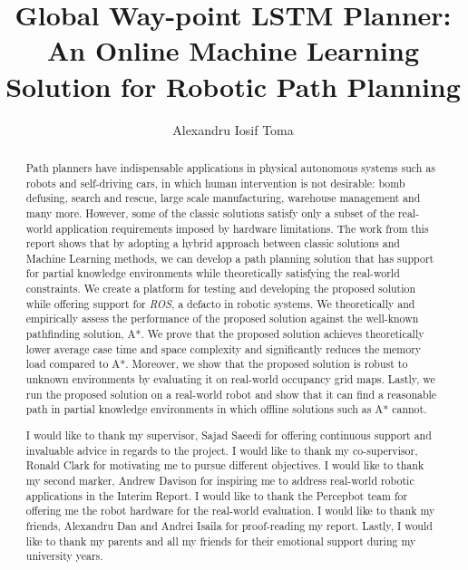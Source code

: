 \documentclass[a4paper, twoside]{report}
\title{Global Way-point LSTM Planner: An Online Machine Learning Solution for Robotic Path Planning}
\author{Alexandru Iosif Toma}
\begin{document}


\newpage
\mbox{}
\newpage

\begin{abstract}

Path planners have indispensable applications in physical autonomous systems such as robots and self-driving cars, in which human intervention is not desirable: bomb defusing, search and rescue, large scale manufacturing, warehouse management and many more. However, some of the classic solutions satisfy only a subset of the real-world application requirements imposed by hardware limitations. The work from this report shows that by adopting a hybrid approach between classic solutions and Machine Learning methods, we can develop a path planning solution that has support for partial knowledge environments while theoretically satisfying the real-world constraints. We create a platform for testing and developing the proposed solution while offering support for \textit{ROS}, a defacto in robotic systems. We theoretically and empirically assess the performance of the proposed solution against the well-known pathfinding solution, A*. We prove that the proposed solution achieves theoretically lower average case time and space complexity and significantly reduces the memory load compared to A*. Moreover, we show that the proposed solution is robust to unknown environments by evaluating it on real-world occupancy grid maps. Lastly, we run the proposed solution on a real-world robot and show that it can find a reasonable path in partial knowledge environments in which offline solutions such as A* cannot.


%

\end{abstract}

\renewcommand{\abstractname}{Acknowledgements}
\begin{abstract}

I would like to thank my supervisor, Sajad Saeedi for offering continuous support and invaluable advice in regards to the project. I would like to thank my co-supervisor, Ronald Clark for motivating me to pursue different objectives. I would like to thank my second marker, Andrew Davison for inspiring me to address real-world robotic applications in the Interim Report. I would like to thank the Percepbot team for offering me the robot hardware for the real-world evaluation. I would like to thank my friends, Alexandru Dan and Andrei Isaila for proof-reading my report. Lastly, I would like to thank my parents and all my friends for their emotional support during my university years.

\end{abstract}
\end{document}
